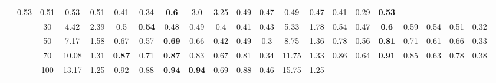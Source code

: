 \documentclass[letterpaper]{article}
\begin{document}
\begin{table*}[]
\begin{tabular}{ccccccccccccccccccccc}
 & 0.53
 & 0.51
 & 0.53
 & 0.51
 & 0.41
 & 0.34
 & \textbf{0.6} & 3.0 & 3.25

 & 0.49
 & 0.47
 & 0.49
 & 0.47
 & 0.41
 & 0.29
 & \textbf{0.53}
\\ & & 30 & 4.42 & 2.39

 & 0.5
 & \textbf{0.54}
 & 0.48
 & 0.49
 & 0.4
 & 0.41
 & 0.43 & 5.33 & 1.78

 & 0.54
 & 0.47
 & \textbf{0.6}
 & 0.59
 & 0.54
 & 0.51
 & 0.32
\\ & & 50 & 7.17 & 1.58

 & 0.67
 & 0.57
 & \textbf{0.69}
 & 0.66
 & 0.42
 & 0.49
 & 0.3 & 8.75 & 1.36

 & 0.78
 & 0.56
 & \textbf{0.81}
 & 0.71
 & 0.61
 & 0.66
 & 0.33
\\ & & 70 & 10.08 & 1.31

 & \textbf{0.87}
 & 0.71
 & \textbf{0.87}
 & 0.83
 & 0.67
 & 0.81
 & 0.34 & 11.75 & 1.33

 & 0.86
 & 0.64
 & \textbf{0.91}
 & 0.85
 & 0.63
 & 0.78
 & 0.38
\\ & & 100 & 13.17 & 1.25

 & 0.92
 & 0.88
 & \textbf{0.94}
 & \textbf{0.94}
 & 0.69
 & 0.88
 & 0.46 & 15.75 & 1.25


\end{tabular}
\end{table*}
\end{document}
